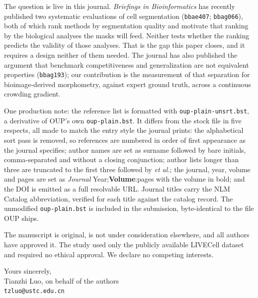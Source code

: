 \documentclass[11pt,a4paper]{article}
\begin{document}
The question is live in this journal. \emph{Briefings in Bioinformatics}
has recently published two systematic evaluations of cell segmentation
(\texttt{bbae407}; \texttt{bbag066}), both of which rank methods by
segmentation quality and motivate that ranking by the biological analyses
the masks will feed. Neither tests whether the ranking predicts the
validity of those analyses. That is the gap this paper closes, and it
requires a design neither of them needed. The journal has also published
the argument that benchmark competitiveness and generalization are not
equivalent properties (\texttt{bbag193}); our contribution is the
measurement of that separation for bioimage-derived morphometry, against
expert ground truth, across a continuous crowding gradient.

One production note: the reference list is formatted with
\texttt{oup-plain-unsrt.bst}, a derivative of OUP's own
\texttt{oup-plain.bst}. It differs from the stock file in five respects,
all made to match the entry style the journal prints: the alphabetical sort
pass is removed, so references are numbered in order of first appearance as
the journal specifies; author names are set as surname followed by bare
initials, comma-separated and without a closing conjunction; author lists
longer than three are truncated to the first three followed by
\emph{et al.}; the journal, year, volume and pages are set as
\emph{Journal} Year;\textbf{Volume}:pages with the volume in bold; and the
DOI is emitted as a full resolvable URL. Journal titles carry the NLM Catalog
abbreviation, verified for each title against the catalog record. The unmodified
\texttt{oup-plain.bst} is included in the submission, byte-identical to the
file OUP ships.

The manuscript is original, is not under consideration elsewhere, and all
authors have approved it. The study used only the publicly available
LIVECell dataset and required no ethical approval. We declare no competing
interests.

\vspace{0.6em}
\noindent Yours sincerely,\\
Tianzhi Luo, on behalf of the authors\\
\texttt{tzluo@ustc.edu.cn}
\end{document}
